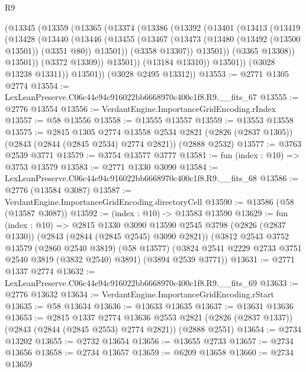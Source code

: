 \begin{lexlean}{R9}
\begin{coremodule}
          (@13345
            (@13359
              (@13365
                (@13374
                  (@13386
                    (@13392
                      (@13401
                        (@13413
                          (@13419
                            (@13428
                              (@13440
                                (@13446
                                  (@13455
                                    (@13467
                                      (@13473 (@13480 (@13492 (@13500 @13501)) (@3351 @80)) @13501))
                                    (@3358 @13307))
                                  @13501))
                              (@3365 @13308))
                            @13501))
                        (@3372 @13309))
                      @13501))
                  (@13184 @13310))
                @13501))
            (@3028 @13238 @13311))
          @13501))
      (@3028 @2495 @13312))
@13553 := @2771 @1305 @2774
@13554 := LexLeanPreserve.C06c44e94c916022bb6668970c400c1f8.R9.__fits_67
@13555 := @2776 @13554
@13556 := VerdantEngine.ImportanceGridEncoding.rIndex
@13557 := @58 @13556
@13558 := @13555 @13557
@13559 := @13553 @13558
@13575 := @2815
    @1305
    @2774
    @13558
    @2534
    @2821
    (@2826 (@2837 @1305))
    (@2843 (@2844 (@2845 @2534) @2774 @2821))
    (@2888 @2532)
@13577 := @3763 @2539 @3771
@13579 := @3754 @13577 @3777
@13581 := fun (index : @10) => @3753 @13579
@13583 := @2771 @1330 @3090
@13584 := LexLeanPreserve.C06c44e94c916022bb6668970c400c1f8.R9.__fits_68
@13586 := @2776 (@13584 @3087)
@13587 := VerdantEngine.ImportanceGridEncoding.directoryCell
@13590 := @13586 (@58 (@13587 @3087))
@13592 := (index : @10) -> @13583 @13590
@13629 := fun (index : @10) =>
  @2815
    @1330
    @3090
    @13590
    @2545
    @3798
    (@2826 (@2837 @1330))
    (@2843 (@2844 (@2845 @2545) @3090 @2821))
    (@3812
      @2543
      @3752
      @13579
      (@2860 @2540 @3819)
      (@58 @13577)
      (@3824 @2541 @2229 @2733 @3751 @2540 @3819 (@3832 @2540) @3891)
      (@3894 @2539 @3771))
@13631 := @2771 @1337 @2774
@13632 := LexLeanPreserve.C06c44e94c916022bb6668970c400c1f8.R9.__fits_69
@13633 := @2776 @13632
@13634 := VerdantEngine.ImportanceGridEncoding.rStart
@13635 := @58 @13634
@13636 := @13633 @13635
@13637 := @13631 @13636
@13653 := @2815
    @1337
    @2774
    @13636
    @2553
    @2821
    (@2826 (@2837 @1337))
    (@2843 (@2844 (@2845 @2553) @2774 @2821))
    (@2888 @2551)
@13654 := @2734 @13202
@13655 := @2732 @13654
@13656 := @13655 @2733
@13657 := @2734 @13656
@13658 := @2734 @13657
@13659 := @6209 @13658
@13660 := @2734 @13659

\end{coremodule}
\end{lexlean}
